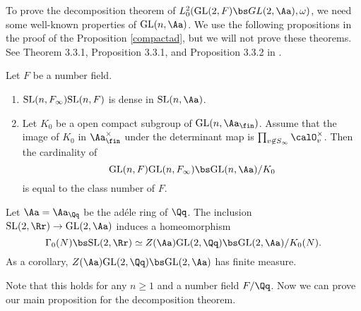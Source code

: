 To prove the decomposition theorem of $L^{2}_{0}(\GL(2, F) \bs GL(2, \Aa), \omega)$, we need some well-known properties of $\GL(n, \Aa)$. 
We use the following propositions in the proof of the Proposition \ref{compactad}, but we will not prove these theorems. See Theorem 3.3.1, Proposition 3.3.1, and Proposition 3.3.2 in \cite{bu}. 



\begin{theorem}
Let $F$ be a number field. 
\begin{enumerate}
\item $\mathrm{SL}(n, F_{\infty})\mathrm{SL}(n, F)$ is dense in $\SL(n, \Aa)$. 
\item Let $K_{0}$ be a open compact subgroup of $\GL(n, \Aa_{\fin})$. Assume that the image of $K_{0}$ in $\Aa_{\fin}^{\times}$ under the determinant map is $\prod_{v\not\in S_{\infty}} \calO_{v}^{\times}$. Then the cardinality of 
$$
\GL(n, F)\GL(n, F_{\infty})\bs \GL(n, \Aa)/K_{0}
$$
is equal to the class number of $F$. 
\end{enumerate}
\end{theorem}

\begin{proposition}
Let $\Aa = \Aa_{\Qq}$ be the ad\'ele ring of $\Qq$. The inclusion $\SL(2, \Rr)\to \GL(2, \Aa)$ induces a homeomorphism 
$$
\Gamma_{0}(N) \bs \SL(2, \Rr) \simeq Z(\Aa) \GL(2, \Qq) \bs \GL(2, \Aa) /K_{0}(N).
$$
As a corollary, $Z(\Aa)\GL(2, \Qq) \bs \GL(2, \Aa)$ has finite measure. 
\end{proposition}
Note that this holds for any $n \geq 1$ and a number field $F/\Qq$. 
Now we can prove our main proposition for the decomposition theorem. 


